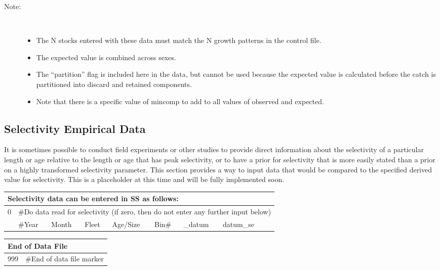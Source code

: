 \begin{description}
	\item[Note:]\
	\begin{itemize}
		\item The N stocks entered with these data must match the N growth patterns in the control file.
		\item The expected value is combined across sexes.
		\item The “partition” flag is included here in the data, but cannot be used because the expected value is calculated before the catch is partitioned into discard and retained components.
		\item Note that there is a specific value of mincomp to add to all values of observed and expected.
	\end{itemize}
\end{description}

\subsection{Selectivity Empirical Data}
It is sometimes possible to conduct field experiments or other studies to provide direct information about the selectivity of a particular length or age relative to the length or age that has peak selectivity, or to have a prior for selectivity that is more easily stated than a prior on a highly transformed selectivity parameter.  This section provides a way to input data that would be compared to the specified derived value for selectivity.  This is a placeholder at this time and will be fully implemented soon.

\begin{center}
	\begin{tabular}{p{1.5cm} p{1.5cm} p{1.5cm} p{1.5cm} p{1.5cm} p{1.5cm} p{1.5cm} p{1.5cm} p{1.1cm}}
		\multicolumn{9}{l}{Selectivity data can be entered in SS as follows:}\\
		\hline
		0 &  \multicolumn{8}{l}{\#Do data read for selectivity (if zero, then do not enter any further input below)}\\
        \hline
		& \#Year & Month & Fleet & Age/Size & Bin\# & \_datum & datum\_se \\
		\hline
	\end{tabular}
\end{center}

\begin{center}
	\begin{tabular}{p{2cm} p{14cm}}\\
		\multicolumn{2}{l}{End of Data File}\\
		\hline
		999 & \#End of data file marker\\
		\hline
	\end{tabular}
\end{center}


